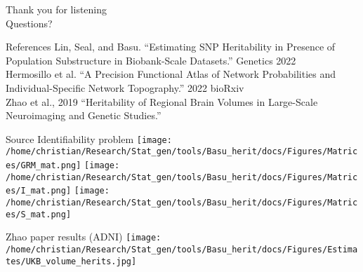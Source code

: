 \documentclass[
  ignorenonframetext,
]{beamer}
\begin{document}
\begin{frame}
\begin{Huge}
Thank you for listening \\
Questions?
\end{Huge}
\end{frame}

\begin{frame}{References}
Lin, Seal, and Basu. “Estimating SNP Heritability in Presence of Population Substructure in Biobank-Scale Datasets.” Genetics 2022 \\
Hermosillo et al. “A Precision Functional Atlas of Network Probabilities and Individual-Specific Network Topography.” 2022 bioRxiv \\
Zhao et al., 2019 “Heritability of Regional Brain Volumes in Large-Scale Neuroimaging and Genetic Studies.”
\end{frame}


\begin{frame}{Source Identifiability problem}
\centering
\texttt{[image: /home/christian/Research/Stat\_gen/tools/Basu\_herit/docs/Figures/Matrices/GRM\_mat.png]}
\texttt{[image: /home/christian/Research/Stat\_gen/tools/Basu\_herit/docs/Figures/Matrices/I\_mat.png]}
\texttt{[image: /home/christian/Research/Stat\_gen/tools/Basu\_herit/docs/Figures/Matrices/S\_mat.png]}
\end{frame}

\begin{frame}{Zhao paper results (ADNI)}
\centering
\texttt{[image: /home/christian/Research/Stat\_gen/tools/Basu\_herit/docs/Figures/Estimates/UKB\_volume\_herits.jpg]}
\end{frame}
\end{document}
